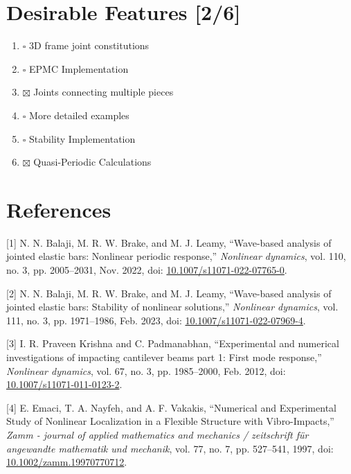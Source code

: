 \documentclass[11pt]{article}
\begin{document}
\section{Desirable Features [2/6]}
\label{sec:org95454df}
\begin{enumerate}
\item{$\square$} 3D frame joint constitutions
\item{$\square$} EPMC Implementation
\item{$\boxtimes$} Joints connecting multiple pieces
\item{$\square$} More detailed examples
\item{$\square$} Stability Implementation
\item{$\boxtimes$} Quasi-Periodic Calculations
\end{enumerate}
\section{References}
\label{sec:org4e3cbf3}
\hypertarget{citeproc_bib_item_1}{[1] N. N. Balaji, M. R. W. Brake, and M. J. Leamy, “Wave-based analysis of jointed elastic bars: Nonlinear periodic response,” \textit{Nonlinear dynamics}, vol. 110, no. 3, pp. 2005–2031, Nov. 2022, doi: \href{https://doi.org/10.1007/s11071-022-07765-0}{10.1007/s11071-022-07765-0}.}

\hypertarget{citeproc_bib_item_2}{[2] N. N. Balaji, M. R. W. Brake, and M. J. Leamy, “Wave-based analysis of jointed elastic bars: Stability of nonlinear solutions,” \textit{Nonlinear dynamics}, vol. 111, no. 3, pp. 1971–1986, Feb. 2023, doi: \href{https://doi.org/10.1007/s11071-022-07969-4}{10.1007/s11071-022-07969-4}.}

\hypertarget{citeproc_bib_item_3}{[3] I. R. Praveen Krishna and C. Padmanabhan, “Experimental and numerical investigations of impacting cantilever beams part 1: First mode response,” \textit{Nonlinear dynamics}, vol. 67, no. 3, pp. 1985–2000, Feb. 2012, doi: \href{https://doi.org/10.1007/s11071-011-0123-2}{10.1007/s11071-011-0123-2}.}

\hypertarget{citeproc_bib_item_4}{[4] E. Emaci, T. A. Nayfeh, and A. F. Vakakis, “Numerical and Experimental Study of Nonlinear Localization in a Flexible Structure with Vibro-Impacts,” \textit{Zamm - journal of applied mathematics and mechanics / zeitschrift für angewandte mathematik und mechanik}, vol. 77, no. 7, pp. 527–541, 1997, doi: \href{https://doi.org/10.1002/zamm.19970770712}{10.1002/zamm.19970770712}.}\bigskip
\end{document}

